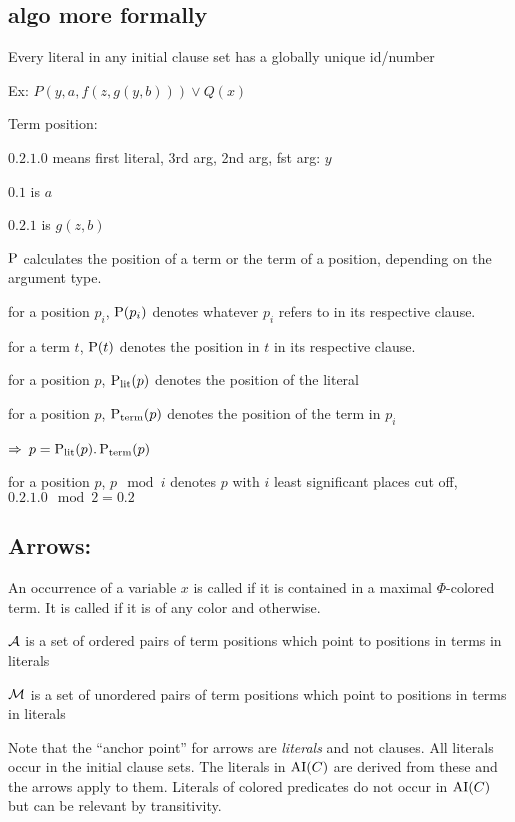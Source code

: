 \documentclass[,%
	paper=a4,%
	DIV14, %
	twoside=false,%
	liststotoc,
	bibtotoc,
	draft=false,%
	numbers=noendperiod
]{scrartcl}
\begin{document}
\clearpage
\subsection{algo more formally}

Every literal in any initial clause set has a globally unique id/number

Ex: $P(y, a, f(z, g(y, b)) ) \lor Q(x)$

Term position:

$0.2.1.0$ means first literal, 3rd arg, 2nd arg, fst arg: $y$

$0.1$ is $a$

$0.2.1$ is $g(z, b)$

$\operatorname{{\operatorname P}}$ calculates the position of a term or the term of a position, depending on the argument type.

for a position $p_i$, $\operatorname{{\operatorname P}}(p_i)$ denotes whatever $p_i$ refers to in its respective clause.

for a term $t$, $\operatorname{{\operatorname P}}(t)$ denotes the position in $t$ in its respective clause.

for a position $p$, $\operatorname{\operatorname{{\operatorname P}}_\mathrm{lit}}(p)$ denotes the position of the literal

for a position $p$, $\operatorname{\operatorname{{\operatorname P}}_\mathrm{term}}(p)$ denotes the position of the term in $p_i$ 

$\Rightarrow$ $p = \operatorname{\operatorname{{\operatorname P}}_\mathrm{lit}}(p).\operatorname{\operatorname{{\operatorname P}}_\mathrm{term}}(p)$

for a position $p$, $p \mod i$ denotes $p$ with $i$ least significant places cut off, $0.2.1.0 \mod 2 = 0.2$

\subsection{Arrows:}

\begin{defi}
	An occurrence of a variable $x$ is called  if it is contained in a maximal $\Phi$-colored term. It is called  if it is of any color and  otherwise.
\end{defi}

$\operatorname{\mathcal{A}}$ is a set of ordered pairs of term positions which point to positions in terms in literals

$\operatorname{\operatorname{\mathcal{M}}}$ is a set of unordered pairs of term positions which point to positions in terms in literals

Note that the ``anchor point'' for arrows are \emph{literals} and not clauses.
All literals occur in the initial clause sets.
The literals in $\operatorname{AI}(C)$ are derived from these and the arrows apply to them.
Literals of colored predicates do not occur in $\operatorname{AI}(C)$ but can be relevant by transitivity.
\end{document}
